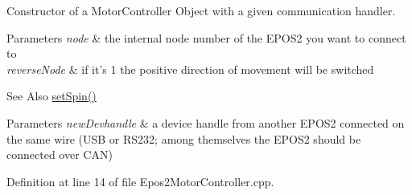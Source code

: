 Constructor of a Motor\-Controller Object with a given communication handler. 


\begin{DoxyParams}{Parameters}
{\em node} & the internal node number of the E\-P\-O\-S2 you want to connect to \\
\hline
{\em reverse\-Node} & if it's 1 the positive direction of movement will be switched \\
\hline
\end{DoxyParams}
\begin{DoxySeeAlso}{See Also}
\hyperlink{classEpos2MotorController_a2ff727bd7ad81302c2feaaf297d888ae}{set\-Spin()} 
\end{DoxySeeAlso}

\begin{DoxyParams}{Parameters}
{\em new\-Devhandle} & a device handle from another E\-P\-O\-S2 connected on the same wire (U\-S\-B or R\-S232; among themselves the E\-P\-O\-S2 should be connected over C\-A\-N) \\
\hline
\end{DoxyParams}


Definition at line 14 of file Epos2\-Motor\-Controller.\-cpp.


